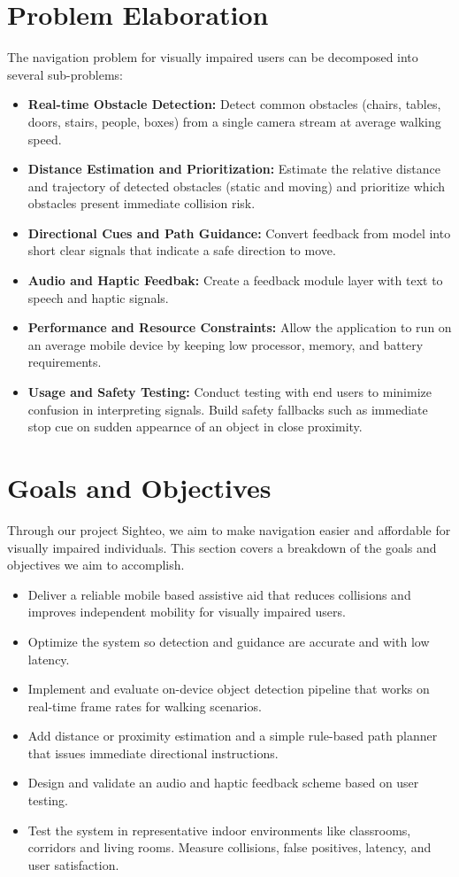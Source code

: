 \documentclass{FastFyp}
\begin{document}
\section{Problem Elaboration}
The navigation problem for visually impaired users can be decomposed into several sub-problems:
\begin{itemize}
    \item \textbf{Real-time Obstacle Detection:} Detect common obstacles (chairs, tables, doors, stairs, people,
 boxes) from a single camera stream at average walking speed.
    \item \textbf{Distance Estimation and Prioritization:} Estimate the relative distance and trajectory of detected
 obstacles (static and moving) and prioritize which obstacles present immediate collision risk.
    \item \textbf{Directional Cues and Path Guidance:} Convert feedback from model into short clear signals that indicate a safe direction to move.
     \item \textbf{Audio and Haptic Feedbak:} Create a feedback module layer with text to speech and haptic signals.
    \item \textbf{Performance and Resource Constraints:} Allow the application to run on an average mobile device by keeping low processor, memory, and battery requirements.
    \item \textbf{Usage and Safety Testing:} Conduct testing with end users to minimize confusion in interpreting signals. Build safety fallbacks such as immediate stop cue on sudden appearnce of an object in close proximity.
\end{itemize}
\section{Goals and Objectives}
Through our project Sighteo, we aim to make navigation easier and affordable for visually impaired individuals. This section covers a breakdown of the goals and objectives we aim to accomplish.
\begin{itemize}
    \item Deliver a reliable mobile based assistive aid that reduces collisions and improves
 independent mobility for visually impaired users.
    \item Optimize the system so detection and guidance are accurate and with low latency.
    \item Implement and evaluate on-device object detection pipeline that works on real-time frame rates
 for walking scenarios.
    \item Add distance or proximity estimation and a simple rule-based path planner that issues immediate
 directional instructions.
    \item Design and validate an audio and haptic feedback scheme based on user testing.
    \item Test the system in representative indoor environments like classrooms, corridors and living
 rooms. Measure collisions, false positives, latency, and user satisfaction.
\end{itemize}
\end{document}
